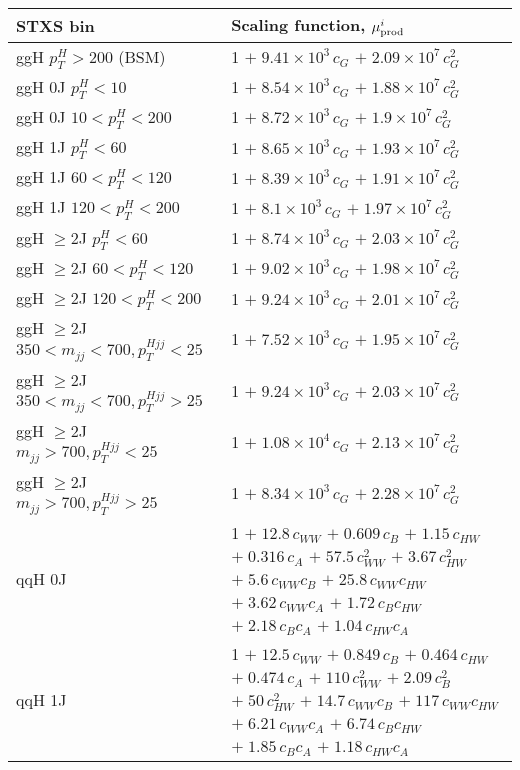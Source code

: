 \begin{tabular}{l|p{}}
    STXS bin & Scaling function, $\mu^i_{\rm{prod}}$ \\ \hline
    ggH $p_{T}^{H} > 200$ (BSM) & 1 $+\;9.41\times 10^{3}\,c_{G}$ $+\;2.09\times 10^{7}\,c_{G}^{2}$ \\
    ggH 0J $p_{T}^{H} < 10$ & 1 $+\;8.54\times 10^{3}\,c_{G}$ $+\;1.88\times 10^{7}\,c_{G}^{2}$ \\
    ggH 0J $10 < p_{T}^{H} < 200$ & 1 $+\;8.72\times 10^{3}\,c_{G}$ $+\;1.9\times 10^{7}\,c_{G}^{2}$ \\
    ggH 1J $p_{T}^{H} < 60$ & 1 $+\;8.65\times 10^{3}\,c_{G}$ $+\;1.93\times 10^{7}\,c_{G}^{2}$ \\
    ggH 1J $60 < p_{T}^{H} < 120$ & 1 $+\;8.39\times 10^{3}\,c_{G}$ $+\;1.91\times 10^{7}\,c_{G}^{2}$ \\
    ggH 1J $120 < p_{T}^{H} < 200$ & 1 $+\;8.1\times 10^{3}\,c_{G}$ $+\;1.97\times 10^{7}\,c_{G}^{2}$ \\
    ggH $\geq$2J $p_{T}^{H} < 60$ & 1 $+\;8.74\times 10^{3}\,c_{G}$ $+\;2.03\times 10^{7}\,c_{G}^{2}$ \\
    ggH $\geq$2J $60 < p_{T}^{H} < 120$ & 1 $+\;9.02\times 10^{3}\,c_{G}$ $+\;1.98\times 10^{7}\,c_{G}^{2}$ \\
    ggH $\geq$2J $120 < p_{T}^{H} < 200$ & 1 $+\;9.24\times 10^{3}\,c_{G}$ $+\;2.01\times 10^{7}\,c_{G}^{2}$ \\
    ggH $\geq$2J $350 < m_{jj} < 700, p_{T}^{Hjj} < 25$ & 1 $+\;7.52\times 10^{3}\,c_{G}$ $+\;1.95\times 10^{7}\,c_{G}^{2}$ \\
    ggH $\geq$2J $350 < m_{jj} < 700, p_{T}^{Hjj} > 25$ & 1 $+\;9.24\times 10^{3}\,c_{G}$ $+\;2.03\times 10^{7}\,c_{G}^{2}$ \\
    ggH $\geq$2J $m_{jj} > 700, p_{T}^{Hjj} < 25$ & 1 $+\;1.08\times 10^{4}\,c_{G}$ $+\;2.13\times 10^{7}\,c_{G}^{2}$ \\
    ggH $\geq$2J $m_{jj} > 700, p_{T}^{Hjj} > 25$ & 1 $+\;8.34\times 10^{3}\,c_{G}$ $+\;2.28\times 10^{7}\,c_{G}^{2}$ \\
    \hline
    qqH 0J & 1 $+\;12.8\,c_{WW}$ $+\;0.609\,c_{B}$ $+\;1.15\,c_{HW}$ $+\;0.316\,c_{A}$ $+\;57.5\,c_{WW}^{2}$ $+\;3.67\,c_{HW}^{2}$ $+\;5.6\,c_{WW}c_{B}$ $+\;25.8\,c_{WW}c_{HW}$ $+\;3.62\,c_{WW}c_{A}$ $+\;1.72\,c_{B}c_{HW}$ $+\;2.18\,c_{B}c_{A}$ $+\;1.04\,c_{HW}c_{A}$ \\
    qqH 1J & 1 $+\;12.5\,c_{WW}$ $+\;0.849\,c_{B}$ $+\;0.464\,c_{HW}$ $+\;0.474\,c_{A}$ $+\;110\,c_{WW}^{2}$ $+\;2.09\,c_{B}^{2}$ $+\;50\,c_{HW}^{2}$ $+\;14.7\,c_{WW}c_{B}$ $+\;117\,c_{WW}c_{HW}$ $+\;6.21\,c_{WW}c_{A}$ $+\;6.74\,c_{B}c_{HW}$ $+\;1.85\,c_{B}c_{A}$ $+\;1.18\,c_{HW}c_{A}$ \\

\end{tabular}
